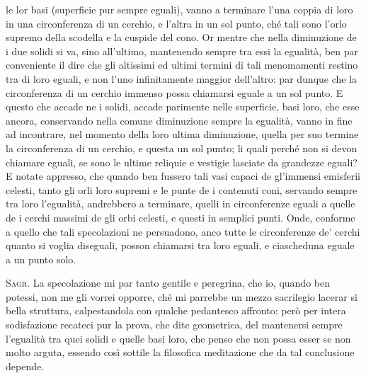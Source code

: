 \documentclass[11pt,twoside,openany]{book}
\newcommand{\speaker}[1]{\textcolor{rubric}{\textsc{#1}}\space}
\begin{document}
le lor basi (superficie pur sempre eguali), vanno a terminare l'una coppia di loro in una circonferenza di un cerchio, e l'altra in un sol punto, ché tali sono l'orlo supremo della scodella e la cuspide del cono. Or mentre che nella diminuzione de i due solidi si va, sino all'ultimo, mantenendo sempre tra essi la egualità, ben par conveniente il dire che gli altissimi ed ultimi termini di tali menomamenti restino tra di loro eguali, e non l'uno infinitamente maggior dell'altro: par dunque che la circonferenza di un cerchio immenso possa chiamarsi eguale a un sol punto. E questo che accade ne i solidi, accade parimente nelle superficie, basi loro, che esse ancora, conservando nella comune diminuzione sempre la egualità, vanno in fine ad incontrare, nel momento della loro ultima diminuzione, quella per suo termine la circonferenza di un cerchio, e questa un sol punto; li quali perché non si devon chiamare eguali, se sono le ultime reliquie e vestigie lasciate da grandezze eguali? E notate appresso, che quando ben fussero tali vasi capaci de gl'immensi emisferii celesti, tanto gli orli loro supremi e le punte de i contenuti coni, servando sempre tra loro l'egualità, andrebbero a terminare, quelli in circonferenze eguali a quelle de i cerchi massimi de gli orbi celesti, e questi in semplici punti. Onde, conforme a quello che tali specolazioni ne persuadono, anco tutte le circonferenze de' cerchi quanto si voglia diseguali, posson chiamarsi tra loro eguali, e ciascheduna eguale a un punto solo.

\speaker{Sagr.} La specolazione mi par tanto gentile e peregrina, che io, quando ben potessi, non me gli vorrei opporre, ché mi parrebbe un mezzo sacrilegio lacerar sì bella struttura, calpestandola con qualche pedantesco affronto: però per intera sodisfazione recateci pur la prova, che dite geometrica, del mantenersi sempre l'egualità tra quei solidi e quelle basi loro, che penso che non possa esser se non molto arguta, essendo così sottile la filosofica meditazione che da tal conclusione depende.
\end{document}
